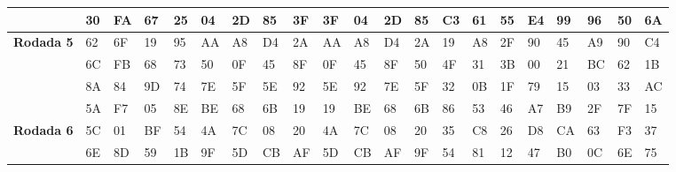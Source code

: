 \documentclass[
    article,            %
    11pt,               %
    oneside,            %
    a4paper,            %
    english,            %
    brazil,             %
    sumario=tradicional,
    ]{abntex2}
\begin{document}
\begin{table}[H]
{\begin{tabular}{|
>{\columncolor[HTML]{C0C0C0}}l |llll|llll|llll|llll|llll|}
                                                     & 30            & FA            & 67            & 25            & 04             & 2D           & 85           & 3F           & 3F            & 04             & 2D           & 85           & C3            & 61            & 55            & E4           & 99            & 96            & 50            & 6A           \\ \hline
\textbf{Rodada 5}                                                    & 62            & 6F            & 19            & 95            & AA            & A8           & D4           & 2A           & AA            & A8            & D4           & 2A           & 19            & A8            & 2F            & 90           & 45            & A9            & 90            & C4           \\
                                                     & 6C            & FB            & 68            & 73            & 50            & 0F           & 45           & 8F           & 0F            & 45            & 8F           & 50           & 4F            & 31            & 3B            & 00            & 21            & BC            & 62            & 1B           \\
                                                     & 8A            & 84            & 9D            & 74            & 7E            & 5F           & 5E           & 92           & 5E            & 92            & 7E           & 5F           & 32            & 0B            & 1F            & 79           & 15            & 03             & 33            & AC           \\
                                                     & 5A            & F7            & 05             & 8E            & BE            & 68           & 6B           & 19           & 19            & BE            & 68           & 6B           & 86            & 53            & 46            & A7           & B9            & 2F            & 7F            & 15           \\ \hline
\textbf{Rodada 6}                                                    & 5C            & 01             & BF            & 54            & 4A            & 7C           & 08            & 20           & 4A            & 7C            & 08            & 20           & 35            & C8            & 26            & D8           & CA            & 63            & F3            & 37           \\
                                                     & 6E            & 8D            & 59            & 1B            & 9F            & 5D           & CB           & AF           & 5D            & CB            & AF           & 9F           & 54            & 81            & 12            & 47           & B0            & 0C            & 6E            & 75           \\

\end{tabular}}
\end{table}
\end{document}
